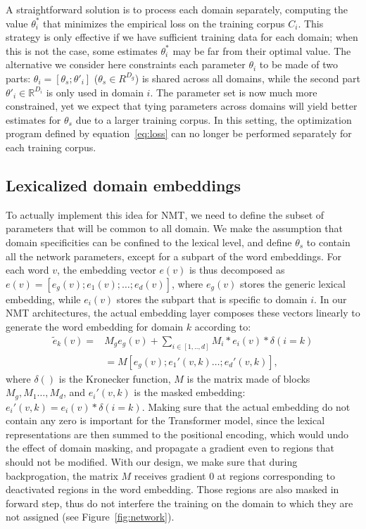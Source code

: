 \documentclass[11pt,a4paper]{article}
\newcommand{\fyDone}[1]{\done[FY]\Todo[FY:]{\textcolor{orange}{#1}}}
\begin{document}
A straightforward solution is to process each domain separately, computing the value $\theta_i^*$ that minimizes the empirical loss on the training corpus $C_i$. This strategy is only effective if we have sufficient training data for each domain; when this is not the case, some estimates $\theta_i^*$ may be far from their optimal value. \fyDone{Risk}
The alternative we consider here constraints each parameter $\theta_i$ to be made of two parts: $\theta_i = [\theta_s; \theta'_i]$ ($\theta_s \in R^{D_g}$) is shared across all domains, while the second part $\theta'_i \in \mathbb{R}^{D_i}$ is only used in domain $i$.
The parameter set is now much more constrained, yet we expect that tying parameters across domains will yield better estimates for $\theta_s$ due to a larger training corpus. In this setting, the optimization program defined by equation~\eqref{eq:loss} can no longer be performed separately for each training corpus.

\subsection{Lexicalized domain embeddings \label{ssec:lde}}

To actually implement this idea for NMT, we need to define the subset of parameters that will be common to all domain. We make the assumption that domain specificities can be confined to the lexical level, and define $\theta_s$ to contain all the network parameters, except for a subpart of the word embeddings. For each word $v$, the embedding vector $e(v)$ is thus decomposed as $e(v) = [e_g(v); e_1(v); \dots; e_d(v)]$, where $e_g(v)$ stores the generic lexical embedding, while $e_i(v)$ stores the subpart that is specific to domain $i$.
In our NMT architectures, the actual embedding layer composes these vectors linearly to generate the word embedding for domain $k$ according to:
\begin{align}
  \tilde{e}_k(v) =& M_g e_g(v) + \sum_{i \in [1,..,d]} M_i * e_i(v) * \delta(i=k) \nonumber \\
   & = M [e_g(v); e_1'(v,k) \dots; e_d'(v,k)], \label{eq:embedding}
\end{align}
where $\delta()$ is the Kronecker function, $M$ is the matrix made of blocks $M_g, M_1 \dots, M_d$, and $e_i'(v,k)$ is the masked embedding: $e_i'(v,k)= e_i(v) * \delta(i=k)$.  Making sure that the actual embedding do not contain any zero is important for the Transformer model, since the lexical representations are then summed to the positional encoding, which would undo the effect of domain masking, and propagate a gradient even to regions that should not be modified. With our design, we make sure that during backprogation, the matrix $M$ receives gradient $0$ at regions corresponding to deactivated regions in the word embedding. Those regions are also masked in forward step, thus do not interfere the training on the domain to which they are not assigned (see Figure~\ref{fig:network}).
\end{document}
